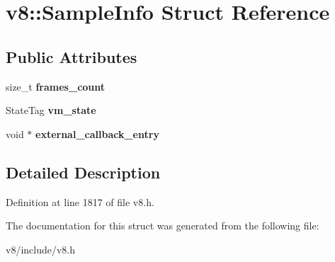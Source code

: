 \hypertarget{structv8_1_1SampleInfo}{}\section{v8\+:\+:Sample\+Info Struct Reference}
\label{structv8_1_1SampleInfo}
\subsection*{Public Attributes}
\begin{DoxyCompactItemize}
\item 
\mbox{\label{structv8_1_1SampleInfo_a5f1e51bc358605e0c1d38fb2f3d344cd}} 
size\+\_\+t {\bfseries frames\+\_\+count}
\item 
\mbox{\label{structv8_1_1SampleInfo_afd6198c9feb44a8df79576cf427b9a91}} 
State\+Tag {\bfseries vm\+\_\+state}
\item 
\mbox{\label{structv8_1_1SampleInfo_ac18636e309f00c66a68a29d78eaf355a}} 
void $\ast$ {\bfseries external\+\_\+callback\+\_\+entry}
\end{DoxyCompactItemize}


\subsection{Detailed Description}


Definition at line 1817 of file v8.\+h.



The documentation for this struct was generated from the following file\+:\begin{DoxyCompactItemize}
\item 
v8/include/v8.\+h\end{DoxyCompactItemize}
